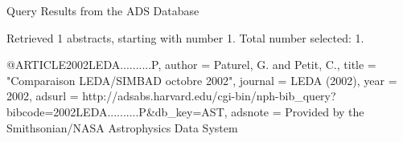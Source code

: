 Query Results from the ADS Database


Retrieved 1 abstracts, starting with number 1.  Total number selected: 1.

@ARTICLE{2002LEDA..........P,
   author = {{Paturel}, G. and {Petit}, C.},
    title = "{Comparaison LEDA/SIMBAD octobre 2002}",
  journal = {LEDA (2002)},
     year = 2002,
   adsurl = {http://adsabs.harvard.edu/cgi-bin/nph-bib_query?bibcode=2002LEDA..........P&db_key=AST},
  adsnote = {Provided by the Smithsonian/NASA Astrophysics Data System}
}



